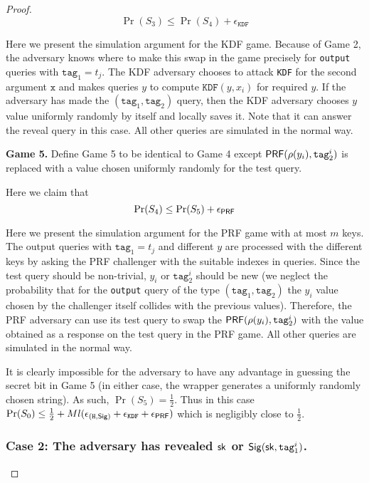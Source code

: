 \documentclass[12pt]{article}
\begin{document}
\begin{proof}
$$
\Pr(S_3) \le \Pr(S_4) + \epsilon_{\texttt{KDF}}
$$

Here we present the simulation argument for the KDF game. Because of Game 2, the adversary knows where to make this swap in the game precisely for \texttt{output} queries with  $\texttt{tag}_1 =t_j$. The KDF adversary chooses to attack \texttt{KDF} for the second argument $\texttt{x}$ and makes queries $y$ to compute $\texttt{KDF}(y, x_i)$ for required $y$.  If the adversary has made the $(\texttt{tag}_1,\texttt{tag}_2)$ query, then the KDF adversary chooses $y$ value uniformly randomly by itself and locally saves it. Note that it can answer the reveal query in this case. All other queries are simulated in the normal way. 

\noindent \textbf{Game 5.} Define Game 5 to be identical to Game 4 except $\mathsf{PRF}(\rho(y_i), \texttt{tag}^i_2)$ is replaced with a value chosen uniformly randomly for the test query.

Here we claim that
$$
\Pr(S_4) \le \Pr(S_5) + \epsilon_{\mathsf{PRF}}
$$

Here we present the simulation argument for the PRF game with at most $m$ keys. The output queries with $\texttt{tag}_1 =t_j$ and different $y$ are processed with the different keys by asking the PRF challenger with the suitable indexes in queries. Since the test query should be non-trivial, $y_i$ or $\texttt{tag}_2^i$ should be new (we neglect the probability that for the \texttt{output} query of the type $(\texttt{tag}_1,\texttt{tag}_2)$ the $y_i$ value chosen by the challenger itself collides with the previous values). Therefore, the PRF adversary can use its test query to swap the $\mathsf{PRF}(\rho(y_i), \texttt{tag}^i_2)$ with the value obtained as a response on the test query in the PRF game. All other queries are simulated in the normal way.
 
It is clearly impossible for the adversary to have any advantage in guessing the secret bit in Game 5 (in either case, the wrapper generates a uniformly randomly chosen string). As such, $\Pr(S_5) = \frac{1}{2}$. Thus in this case $\Pr(S_0) \le \frac{1}{2} + Ml( \epsilon_{(\texttt{H}, \mathsf{Sig})} + \epsilon_{\texttt{KDF}} + \epsilon_{\mathsf{PRF}})$ which is negligibly close to $\frac{1}{2}$.

\subsubsection*{Case 2: The adversary has revealed $\mathsf{sk}$ or $\mathsf{Sig}(\mathsf{sk}, \texttt{tag}_1^i)$.}


\end{proof}
\end{document}
